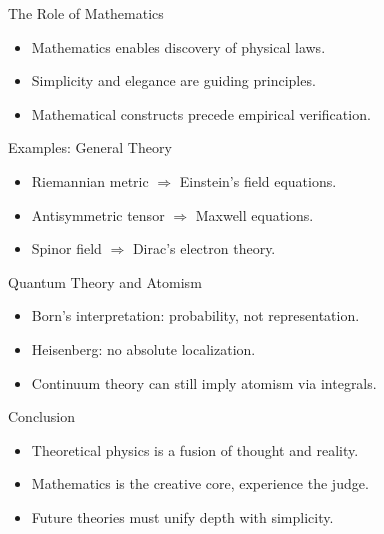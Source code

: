 \begin{frame}{The Role of Mathematics}
  \begin{itemize}
    \item Mathematics enables discovery of physical laws.
    \item Simplicity and elegance are guiding principles.
    \item Mathematical constructs precede empirical verification.
  \end{itemize}
\end{frame}

\begin{frame}{Examples: General Theory}
  \begin{itemize}
    \item Riemannian metric \(\Rightarrow\) Einstein's field equations.
    \item Antisymmetric tensor \(\Rightarrow\) Maxwell equations.
    \item Spinor field \(\Rightarrow\) Dirac's electron theory.
  \end{itemize}
\end{frame}

\begin{frame}{Quantum Theory and Atomism}
  \begin{itemize}
    \item Born's interpretation: probability, not representation.
    \item Heisenberg: no absolute localization.
    \item Continuum theory can still imply atomism via integrals.
  \end{itemize}
\end{frame}

\begin{frame}{Conclusion}
  \begin{itemize}
    \item Theoretical physics is a fusion of thought and reality.
    \item Mathematics is the creative core, experience the judge.
    \item Future theories must unify depth with simplicity.
  \end{itemize}
\end{frame}
